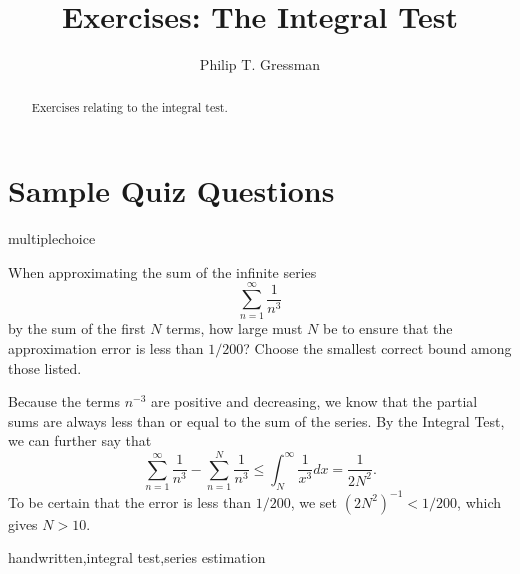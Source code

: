 \documentclass{ximera}
\title{Exercises: The Integral Test}
\author{Philip T. Gressman}
\begin{document}
\begin{abstract}
Exercises relating to the integral test.
\end{abstract}
\maketitle

\section*{Sample Quiz Questions}

\begin{question}[2019IntegTestErr1]
\begin{type}
multiplechoice
\end{type}
When approximating the sum of the infinite series
\[ \sum_{n=1}^\infty \frac{1}{n^3} \]
by the sum of the first \(N\) terms, how large must \(N\) be to ensure that the approximation error is less than \(1/200\)? Choose the smallest correct bound among those listed.
\begin{multiplechoice}
\end{multiplechoice}
\begin{feedback}
Because the terms \(n^{-3}\) are positive and decreasing, we know that the partial sums are always less than or equal to the sum of the series. By the Integral Test, we can further say that
\[ \sum_{n=1}^\infty \frac{1}{n^3} - \sum_{n=1}^N \frac{1}{n^3} \leq \int_N^\infty \frac{1}{x^3} dx  = \frac{1}{2N^2}.\]
To be certain that the error is less than \(1/200\), we set \((2 N^2)^{-1} < 1/200\), which gives \(N > 10\).
\end{feedback}
\begin{keywords}
handwritten,integral test,series estimation
\end{keywords}
\end{question}
\end{document}
